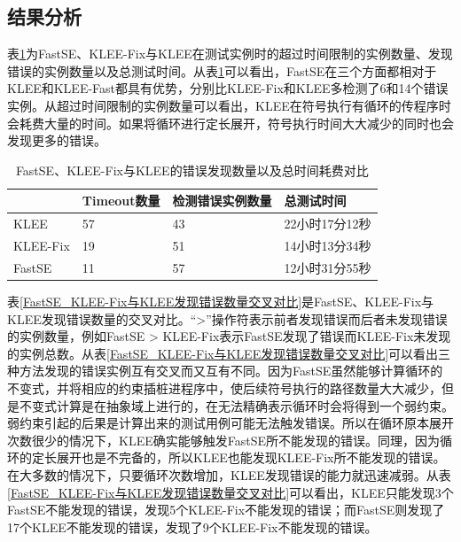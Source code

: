 \subsection{结果分析}
表\ref{FastSE_KLEE-Fix与KLEE的发现错误数量以及总时间耗费对比}为FastSE、KLEE-Fix与KLEE在测试实例时的超过时间限制的实例数量、发现错误的实例数量以及总测试时间。从表\ref{FastSE_KLEE-Fix与KLEE的发现错误数量以及总时间耗费对比}可以看出，FastSE在三个方面都相对于KLEE和KLEE-Fast都具有优势，分别比KLEE-Fix和KLEE多检测了6和14个错误实例。从超过时间限制的实例数量可以看出，KLEE在符号执行有循环的传程序时会耗费大量的时间。如果将循环进行定长展开，符号执行时间大大减少的同时也会发现更多的错误。

\begin{table}[ht]
\begin{center}
\caption{FastSE、KLEE-Fix与KLEE的错误发现数量以及总时间耗费对比}
\label{FastSE_KLEE-Fix与KLEE的发现错误数量以及总时间耗费对比}
\begin{tabular}{|l|l|l|l|}
\hline
{\bf } & {\bf Timeout数量} & {\bf 检测错误实例数量} & {\bf 总测试时间} \\
\hline
KLEE & 57 & 43 & 22小时17分12秒 \\
KLEE-Fix & 19 & 51 & 14小时13分34秒\\
FastSE & 11 & 57 & 12小时31分55秒\\
\hline
\end{tabular}
\end{center}
\end{table}

表\ref{FastSE_KLEE-Fix与KLEE发现错误数量交叉对比}是FastSE、KLEE-Fix与KLEE发现错误数量的交叉对比。“>”操作符表示前者发现错误而后者未发现错误的实例数量，例如FastSE > KLEE-Fix表示FastSE发现了错误而KLEE-Fix未发现的实例总数。从表\ref{FastSE_KLEE-Fix与KLEE发现错误数量交叉对比}可以看出三种方法发现的错误实例互有交叉而又互有不同。因为FastSE虽然能够计算循环的不变式，并将相应的约束插桩进程序中，使后续符号执行的路径数量大大减少，但是不变式计算是在抽象域上进行的，在无法精确表示循环时会将得到一个弱约束。弱约束引起的后果是计算出来的测试用例可能无法触发错误。所以在循环原本展开次数很少的情况下，KLEE确实能够触发FastSE所不能发现的错误。同理，因为循环的定长展开也是不完备的，所以KLEE也能发现KLEE-Fix所不能发现的错误。在大多数的情况下，只要循环次数增加，KLEE发现错误的能力就迅速减弱。从表\ref{FastSE_KLEE-Fix与KLEE发现错误数量交叉对比}可以看出，KLEE只能发现3个FastSE不能发现的错误，发现5个KLEE-Fix不能发现的错误；而FastSE则发现了17个KLEE不能发现的错误，发现了9个KLEE-Fix不能发现的错误。

